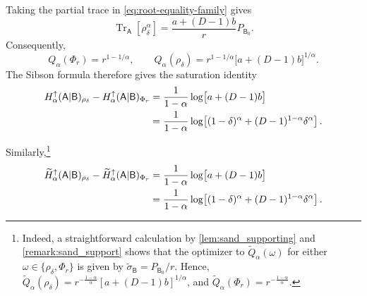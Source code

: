 \documentclass[11pt,reqno]{amsart}
\theoremstyle{definition}
\DeclareMathOperator{\Tr}{Tr}
\newcommand{\A}{\mathsf{A}}
\newcommand{\B}{\mathsf{B}}
\newcommand{\sand}{\widetilde}
\begin{document}
Taking the partial trace in \cref{eq:root-equality-family} gives
\begin{equation}\label{eq:isotropic-root-marginal}
	\Tr_{\A}[\rho_\delta^\alpha]
	=
	\frac{a+(D-1)b}{r}P_{\B_0}.
\end{equation}
Consequently,
\begin{equation}\label{eq:isotropic-Q-values}
	Q_\alpha(\Phi_r)
	=
	r^{1-1/\alpha},
	\qquad
	Q_\alpha(\rho_\delta)
	=
	r^{1-1/\alpha}
	\bigl[a+(D-1)b\bigr]^{1/\alpha}.
\end{equation}
The Sibson formula therefore gives the saturation identity
\begin{align}
	H_\alpha^\uparrow(\A|\B)_{\rho_\delta}
	-H_\alpha^\uparrow(\A|\B)_{\Phi_r}
	&=
	\frac{1}{1-\alpha}
	\log\bigl[a+(D-1)b\bigr]
	\notag\\
	&=
	\frac{1}{1-\alpha}
	\log\!\left[
	(1-\delta)^\alpha
	+(D-1)^{1-\alpha}\delta^\alpha
	\right].
	\label{eq:isotropic-saturation}
\end{align}

Similarly,\footnote{
Indeed, a straightforward calculation by \cref{lem:sand_supporting} and \cref{remark:sand_support} shows that the optimizer to $\sand Q_{\alpha}(\omega)$ for either $\omega\in\{\rho_{\delta},\Phi_r\}$ is given by $\sand \sigma_{\B} = P_{\B_0}/r$. 
Hence, $\sand Q_{\alpha}(\rho_\delta)
 =r^{-\frac{1-\alpha}{\alpha}}
 [a+(D-1)b]^{1/\alpha}$,
 and
 $\sand Q_{\alpha}(\Phi_r)
 =r^{-\frac{1-\alpha}{\alpha}}$.
}
\begin{align}
	\sand H_\alpha^\uparrow(\A|\B)_{\rho_\delta}
	- \sand H_\alpha^\uparrow(\A|\B)_{\Phi_r}
	&=
	\frac{1}{1-\alpha}
	\log\bigl[a+(D-1)b\bigr]
	\notag\\
	&=
	\frac{1}{1-\alpha}
	\log\!\left[
	(1-\delta)^\alpha
	+(D-1)^{1-\alpha}\delta^\alpha
	\right].
\end{align}
\end{document}
